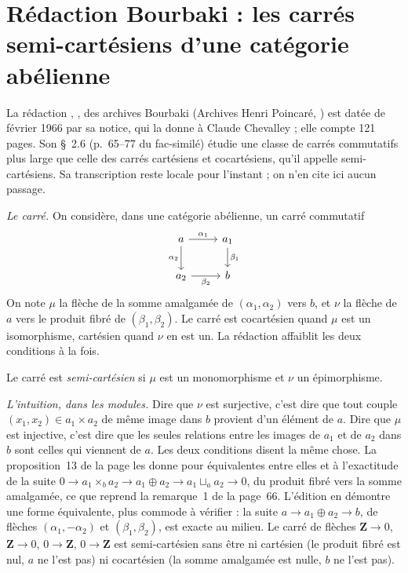 \section[Rédaction Bourbaki \redac{461} : carrés semi-cartésiens]{Rédaction Bourbaki  : les carrés semi-cartésiens d'une catégorie abélienne\protect{}}\label{sec:bourbaki-461}

La rédaction , , des archives Bourbaki (Archives Henri Poincaré, ) est datée de février 1966 par sa notice, qui la donne à Claude Chevalley ; elle compte 121 pages. Son §~2.6 (p.~65--77 du fac-similé) étudie une classe de carrés commutatifs plus large que celle des carrés cartésiens et cocartésiens, qu'il appelle semi-cartésiens. Sa transcription reste locale pour l'instant ; on n'en cite ici aucun passage.

\emph{Le carré.} On considère, dans une catégorie abélienne, un carré commutatif
\[
\begin{tikzcd}
a \arrow[r, "\alpha_1"] \arrow[d, "\alpha_2"'] & a_1 \arrow[d, "\beta_1"] \\
a_2 \arrow[r, "\beta_2"'] & b
\end{tikzcd}
\]
On note $\mu$ la flèche de la somme amalgamée de $(\alpha_1, \alpha_2)$ vers $b$, et $\nu$ la flèche de $a$ vers le produit fibré de $(\beta_1, \beta_2)$. Le carré est cocartésien quand $\mu$ est un isomorphisme, cartésien quand $\nu$ en est un. La rédaction affaiblit les deux conditions à la fois.

\begin{definition}
Le carré est \emph{semi-cartésien} si $\mu$ est un monomorphisme et $\nu$ un épimorphisme.
\end{definition}

\emph{L'intuition, dans les modules.} Dire que $\nu$ est surjective, c'est dire que tout couple $(x_1, x_2) \in a_1 \times a_2$ de même image dans $b$ provient d'un élément de $a$. Dire que $\mu$ est injective, c'est dire que les seules relations entre les images de $a_1$ et de $a_2$ dans $b$ sont celles qui viennent de $a$. Les deux conditions disent la même chose. La proposition~13 de la page les donne pour équivalentes entre elles et à l'exactitude de la suite $0 \to a_1 \times_b a_2 \to a_1 \oplus a_2 \to a_1 \sqcup_a a_2 \to 0$, du produit fibré vers la somme amalgamée, ce que reprend la remarque~1 de la page~66. L'édition en démontre une forme équivalente, plus commode à vérifier : la suite $a \to a_1 \oplus a_2 \to b$, de flèches $(\alpha_1, -\alpha_2)$ et $(\beta_1, \beta_2)$, est exacte au milieu. Le carré de flèches $\mathbf Z \to 0$, $\mathbf Z \to 0$, $0 \to \mathbf Z$, $0 \to \mathbf Z$ est semi-cartésien sans être ni cartésien (le produit fibré est nul, $a$ ne l'est pas) ni cocartésien (la somme amalgamée est nulle, $b$ ne l'est pas).

